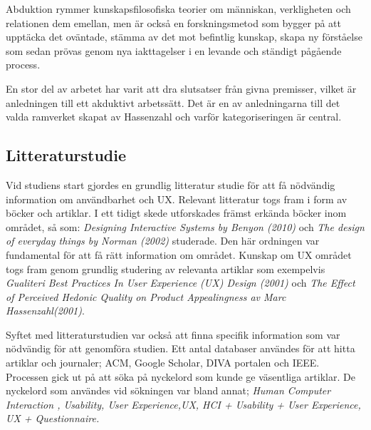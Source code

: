 Abduktion rymmer kunskapsfilosofiska teorier om människan, verkligheten och relationen dem emellan, men är också en forskningsmetod som bygger på att upptäcka det oväntade, stämma av det mot befintlig kunskap, skapa ny förståelse som sedan prövas genom nya iakttagelser i en levande och ständigt pågående process. \cite{Langendoen1999HowWorks}

En stor del av arbetet har varit att dra slutsatser från givna premisser, vilket är anledningen till ett akduktivt arbetssätt. Det är en av anledningarna till det valda ramverket skapat av Hassenzahl \cite{HassenzahlUserQuality} och varför kategoriseringen är central. 
\newline

\subsection{Litteraturstudie}
Vid studiens start gjordes en grundlig litteratur studie för att få nödvändig information om användbarhet och UX. Relevant litteratur togs fram i form av böcker och artiklar. I ett tidigt skede utforskades främst erkända böcker inom området, så som: 
\textit{Designing Interactive Systems by Benyon (2010)} och \textit{The design of everyday things by Norman (2002)} studerade. Den här ordningen var fundamental för att få rätt information om området. Kunskap om UX området togs fram genom grundlig studering av relevanta artiklar som exempelvis \textit{Gualiteri Best Practices In User Experience (UX) Design (2001)} och \textit{The Effect of Perceived Hedonic Quality on Product Appealingness av Marc Hassenzahl(2001)}. 
\newline

Syftet med litteraturstudien var också att finna specifik information som var nödvändig för att genomföra studien. Ett antal databaser användes för att hitta artiklar och journaler; ACM, Google Scholar, DIVA portalen och IEEE. Processen gick ut på att söka på nyckelord som kunde ge väsentliga artiklar. De nyckelord som användes vid sökningen var bland annat; \textit{Human Computer Interaction ,  Usability, User Experience,UX, HCI + Usability + User Experience, UX + Questionnaire.} 
\newline

